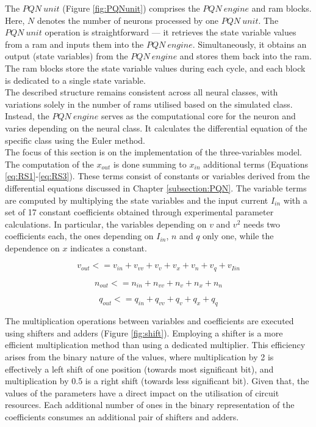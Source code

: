 The $PQN\ unit$ (Figure \ref{fig:PQNunit}) comprises the $PQN\ engine$ and \acrshort{ram} blocks. 
Here, $N$ denotes the number of neurons processed by one $PQN\ unit$. The $PQN\ unit$ operation 
is straightforward — it retrieves the state variable values from a \acrshort{ram} and inputs them into the $PQN\ engine$. 
Simultaneously, it obtains an output (state variables) from the $PQN\ engine$ and stores them back into the \acrshort{ram}. 
The \acrshort{ram} blocks store the state variable values during each cycle, and each block is dedicated to a single state variable.\\
The described structure remains consistent across all neural classes, with variations solely in the number of \acrshort{ram}s utilised 
based on the simulated class. Instead, the $PQN\ engine$ serves as the computational core for the neuron and varies depending on the neural class. 
It calculates the differential equation of the specific class using the Euler method.\\

The focus of this section is on the implementation of the three-variables model. 
The computation of the \(x_{out}\) is done summing to \(x_{in}\) additional terms 
(Equations \ref{eq:RS1}-\ref{eq:RS3}). 
These terms consist of constants or variables derived from the differential 
equations discussed in Chapter \ref{subsection:PQN}. The variable terms are 
computed by multiplying the state variables and the input current \(I_{in}\) 
with a set of 17 constant coefficients obtained through experimental parameter 
calculations. In particular, the variables depending on \(v\) and \(v^2\) needs 
two coefficients each, the ones depending on \(I_{in}\), \(n\) and \(q\) only one, 
while the dependence on \(x\) indicates a constant.

\begin{equation}
    v_{out} <= v_{in} + v_{vv} + v_{v} + v_{x} + v_{n} + v_{q} + v_{Iin}
    \label{eq:RS1}
\end{equation}

\begin{equation}
    n_{out} <= n_{in} + n_{vv} + n_{v} + n_{x} + n_{n}
    \label{eq:RS2}
\end{equation}

\begin{equation}
    q_{out} <= q_{in} + q_{vv} + q_{v} + q_{x} + q_{q}
    \label{eq:RS3}
\end{equation}

The multiplication operations between variables and coefficients are executed 
using shifters and adders (Figure \ref{fig:shift}). Employing a shifter is a more 
efficient multiplication method than using a dedicated multiplier. This 
efficiency arises from the binary nature of the values, where multiplication 
by 2 is effectively a left shift of one position (towards most significant bit), 
and multiplication by 0.5 is a right shift (towards less significant bit). Given that, the values of the parameters have a direct impact on the utilisation of circuit resources. Each additional number of ones in the binary representation of the coefficients consumes an additional pair of shifters and adders.\\

